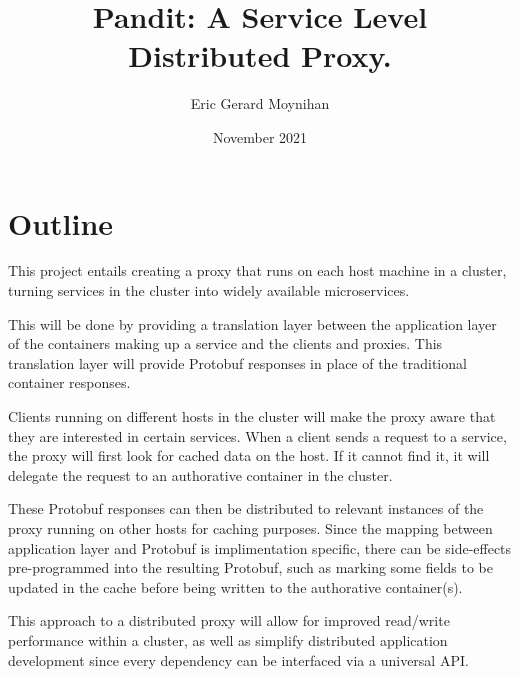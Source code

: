 \documentclass[12pt]{article}
\title{Pandit: A Service Level Distributed Proxy.}
\author{Eric Gerard Moynihan}
\date{November 2021}
\begin{document}
\maketitle

\section{Outline}
This project entails creating a proxy that runs on each host machine in a cluster, turning services in the cluster into widely available microservices. 

This will be done by providing a translation layer between the application layer of the containers making up a service and the clients and proxies.
This translation layer will provide Protobuf responses in place of the traditional container responses.

Clients running on different hosts in the cluster will make the proxy aware that they are interested in certain services.
When a client sends a request to a service, the proxy will first look for cached data on the host. 
If it cannot find it, it will delegate the request to an authorative container in the cluster.

These Protobuf responses can then be distributed to relevant instances of the proxy running on other hosts for caching purposes.
Since the mapping between application layer and Protobuf is implimentation specific, there can be side-effects pre-programmed into the resulting Protobuf, such as marking some fields to be updated in the cache before being written to the authorative container(s).

This approach to a distributed proxy will allow for improved read/write performance within a cluster, as well as simplify distributed application development since every dependency can be interfaced via a universal API.
\end{document}
